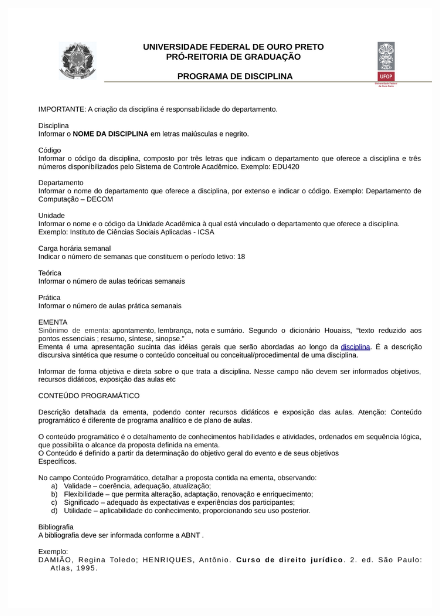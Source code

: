 \begin{figure}[p]
	\centering 
	\includegraphics[scale=0.7]{capitulos/modelo-programa/pdp2.pdf}
\end{figure}

